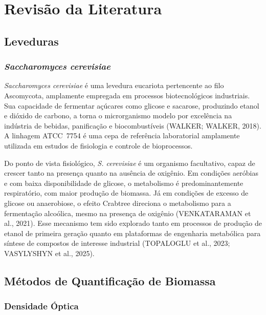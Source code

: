 
\section{Revisão da Literatura}

\subsection{Leveduras}

\subsubsection{\textit{Saccharomyces cerevisiae}}

\textit{Saccharomyces cerevisiae} é uma levedura eucariota pertencente ao filo Ascomycota, amplamente empregada em processos biotecnológicos industriais. Sua capacidade de fermentar açúcares como glicose e sacarose, produzindo etanol e dióxido de carbono, a torna o microrganismo modelo por excelência na indústria de bebidas, panificação e biocombustíveis (WALKER; WALKER, 2018). A linhagem ATCC~7754 é uma cepa de referência laboratorial amplamente utilizada em estudos de fisiologia e controle de bioprocessos.

Do ponto de vista fisiológico, \textit{S. cerevisiae} é um organismo facultativo, capaz de crescer tanto na presença quanto na ausência de oxigênio. Em condições aeróbias e com baixa disponibilidade de glicose, o metabolismo é predominantemente respiratório, com maior produção de biomassa. Já em condições de excesso de glicose ou anaerobiose, o efeito Crabtree direciona o metabolismo para a fermentação alcoólica, mesmo na presença de oxigênio (VENKATARAMAN et al., 2021). Esse mecanismo tem sido explorado tanto em processos de produção de etanol de primeira geração quanto em plataformas de engenharia metabólica para síntese de compostos de interesse industrial (TOPALOGLU et al., 2023; VASYLYSHYN et al., 2025).

\subsection{Métodos de Quantificação de Biomassa}

\subsubsection{Densidade Óptica}

